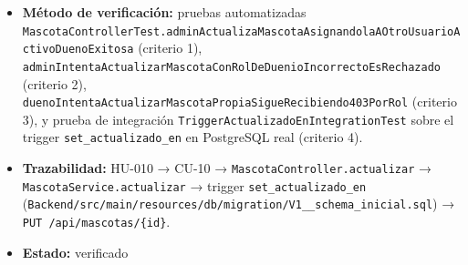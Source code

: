 \documentclass[
  spanish,
]{article}
\providecommand{\tightlist}{%
  \setlength{\itemsep}{0pt}\setlength{\parskip}{0pt}}
\begin{document}
\begin{itemize}
  \begin{enumerate}
  \def\labelenumi{\arabic{enumi}.}
  \tightlist
  \item
    Dado un \texttt{ROLE\_\allowbreak{}ADMIN} y una mascota activa, cuando envía
    \texttt{PUT\ /\allowbreak{}api/\allowbreak{}mascotas/\allowbreak{}\{id\}} con datos válidos, entonces la
    respuesta es \texttt{200\ OK} con los datos actualizados.
  \item
    Dado un nuevo \texttt{duenio\allowbreak{}Id} cuyo rol no es \texttt{ROLE\_\allowbreak{}DUENO},
    entonces la solicitud es rechazada con \texttt{400} y
    \texttt{Problem\allowbreak{}Detail}.
  \item
    Dado un usuario con rol \texttt{ROLE\_\allowbreak{}DUENO}, cuando intenta
    actualizar incluso su propia mascota, entonces la respuesta es
    \texttt{403} (la restricción es por rol, no por propiedad).
  \item
    Tras una actualización, el valor de \texttt{actualizado\_\allowbreak{}en} de la
    fila es posterior al que tenía antes de la operación.
  \end{enumerate}
\item
  \textbf{Método de verificación:} pruebas automatizadas
  \texttt{Mascota\allowbreak{}Controller\allowbreak{}Test.\allowbreak{}admin\allowbreak{}Actualiza\allowbreak{}Mascota\allowbreak{}Asignandola\allowbreak{}AOtro\allowbreak{}Usuario\allowbreak{}Activo\allowbreak{}Dueno\allowbreak{}Exitosa}
  (criterio 1),
  \texttt{admin\allowbreak{}Intenta\allowbreak{}Actualizar\allowbreak{}Mascota\allowbreak{}Con\allowbreak{}Rol\allowbreak{}De\allowbreak{}Duenio\allowbreak{}Incorrecto\allowbreak{}Es\allowbreak{}Rechazado}
  (criterio 2),
  \texttt{dueno\allowbreak{}Intenta\allowbreak{}Actualizar\allowbreak{}Mascota\allowbreak{}Propia\allowbreak{}Sigue\allowbreak{}Recibiendo403\allowbreak{}Por\allowbreak{}Rol}
  (criterio 3), y prueba de integración
  \texttt{Trigger\allowbreak{}Actualizado\allowbreak{}En\allowbreak{}Integration\allowbreak{}Test} sobre el trigger
  \texttt{set\_\allowbreak{}actualizado\_\allowbreak{}en} en PostgreSQL real (criterio 4).
\item
  \textbf{Trazabilidad:} HU-010 → CU-10 →
  \texttt{Mascota\allowbreak{}Controller.\allowbreak{}actualizar} →
  \texttt{Mascota\allowbreak{}Service.\allowbreak{}actualizar} → trigger
  \texttt{set\_\allowbreak{}actualizado\_\allowbreak{}en}
  (\texttt{Backend/\allowbreak{}src/\allowbreak{}main/\allowbreak{}resources/\allowbreak{}db/\allowbreak{}migration/\allowbreak{}V1\_\allowbreak{}\_\allowbreak{}schema\_\allowbreak{}inicial.\allowbreak{}sql})
  → \texttt{PUT\ /\allowbreak{}api/\allowbreak{}mascotas/\allowbreak{}\{id\}}.
\item
  \textbf{Estado:} verificado
\end{itemize}
\end{document}
